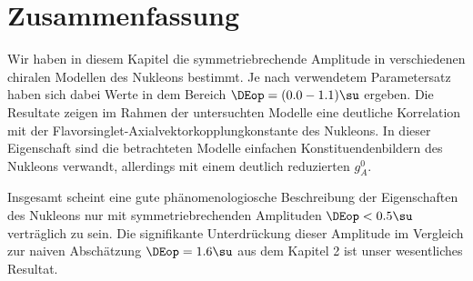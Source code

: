 \section{Zusammenfassung}  
Wir haben in diesem Kapitel die symmetriebrechende Amplitude 
in verschiedenen chiralen Modellen des Nukleons bestimmt. 
Je nach verwendetem Parametersatz haben sich dabei Werte
in dem Bereich $\DEop =(0.0-1.1)\su$ ergeben. Die Resultate
zeigen im Rahmen der untersuchten Modelle eine deutliche 
Korrelation mit der Flavorsinglet-Axialvektorkopplungkonstante
des Nukleons. In dieser Eigenschaft sind die betrachteten 
Modelle einfachen Konstituendenbildern des Nukleons verwandt,
allerdings mit einem deutlich reduzierten $g_A^0$. 

Insgesamt scheint eine gute ph\"anomenologiosche Beschreibung 
der Eigenschaften des Nukleons nur mit symmetriebrechenden
Amplituden $\DEop <0.5 \su$ vertr\"aglich zu sein. Die 
signifikante Unterdr\"uckung dieser Amplitude im Vergleich
zur naiven Absch\"atzung $\DEop = 1.6\su$ aus dem Kapitel
2 ist unser wesentliches Resultat. 
